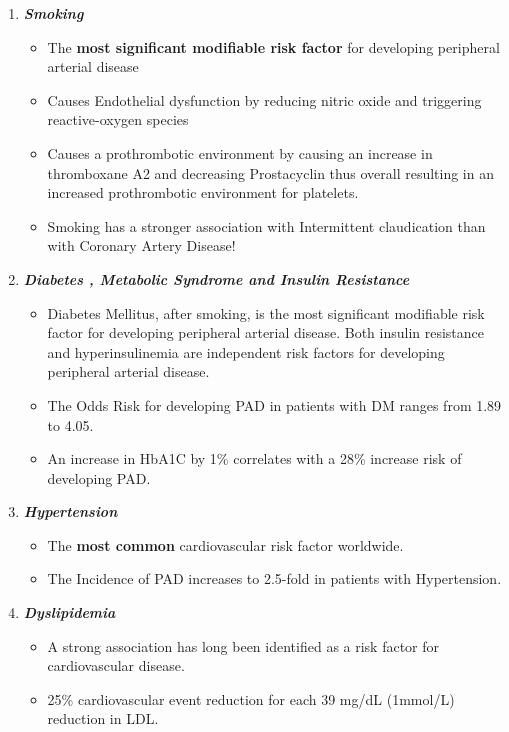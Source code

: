 \documentclass[
]{book}
\begin{document}
\begin{enumerate}
\def\labelenumi{\arabic{enumi}.}
\item
  \textbf{\emph{Smoking}}

  \begin{itemize}
  \item
    The \textbf{most significant modifiable risk factor} for developing
    peripheral arterial disease
  \item
    Causes Endothelial dysfunction by reducing nitric oxide and
    triggering reactive-oxygen species
    \citep{unitedstatessurgeongeneralHealthConsequencesSmoking2014}
  \item
    Causes a prothrombotic environment by causing an increase in
    thromboxane A2 and decreasing Prostacyclin thus overall
    resulting in an increased prothrombotic environment for
    platelets.
  \item
    Smoking has a stronger association with Intermittent
    claudication than with Coronary Artery Disease!
    \citep{gordonPredispositionAtherosclerosisHead1972}
  \end{itemize}
\item
  \textbf{\emph{Diabetes , Metabolic Syndrome and Insulin Resistance}}

  \begin{itemize}
  \item
    Diabetes Mellitus, after smoking, is the most significant
    modifiable risk factor for developing peripheral arterial
    disease. Both insulin resistance and hyperinsulinemia are
    independent risk factors for developing peripheral arterial
    disease.
  \item
    The Odds Risk for developing PAD in patients with DM ranges from
    1.89 to 4.05.
  \item
    An increase in HbA1C by 1\% correlates with a 28\% increase risk
    of developing PAD. \citep{adlerUKPDS59Hyperglycemia2002}
  \end{itemize}
\item
  \textbf{\emph{Hypertension}}

  \begin{itemize}
  \item
    The \textbf{most common} cardiovascular risk factor worldwide.
  \item
    The Incidence of PAD increases to 2.5-fold in patients with
    Hypertension. \citep{kannelUpdateEpidemiologicFeatures1985}
  \end{itemize}
\item
  \textbf{\emph{Dyslipidemia}}

  \begin{itemize}
  \item
    A strong association has long been identified as a risk factor
    for cardiovascular disease.
  \item
    25\% cardiovascular event reduction for each 39 mg/dL (1mmol/L)
    reduction in LDL.
    \citep{heartprotectionstudycollaborativegroupRandomizedTrialEffects2007}
  \end{itemize}
\end{enumerate}
\end{document}

